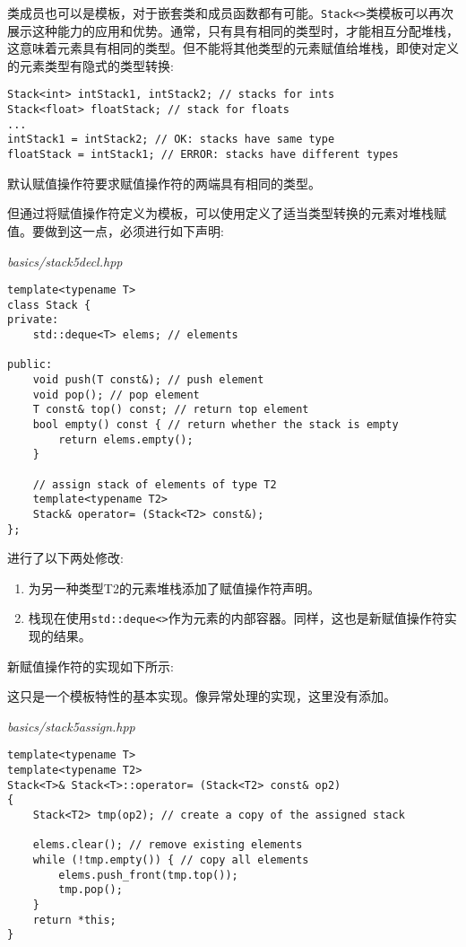 
类成员也可以是模板，对于嵌套类和成员函数都有可能。\texttt{Stack<>}类模板可以再次展示这种能力的应用和优势。通常，只有具有相同的类型时，才能相互分配堆栈，这意味着元素具有相同的类型。但不能将其他类型的元素赋值给堆栈，即使对定义的元素类型有隐式的类型转换:

\begin{lstlisting}[style=styleCXX]
Stack<int> intStack1, intStack2; // stacks for ints
Stack<float> floatStack; // stack for floats
...
intStack1 = intStack2; // OK: stacks have same type
floatStack = intStack1; // ERROR: stacks have different types
\end{lstlisting}

默认赋值操作符要求赋值操作符的两端具有相同的类型。

但通过将赋值操作符定义为模板，可以使用定义了适当类型转换的元素对堆栈赋值。要做到这一点，必须进行如下声明:

\noindent
\textit{basics/stack5decl.hpp}
\begin{lstlisting}[style=styleCXX]
template<typename T>
class Stack {
private:
	std::deque<T> elems; // elements
	
public:
	void push(T const&); // push element
	void pop(); // pop element
	T const& top() const; // return top element
	bool empty() const { // return whether the stack is empty
		return elems.empty();
	}
	
	// assign stack of elements of type T2
	template<typename T2>
	Stack& operator= (Stack<T2> const&);
};
\end{lstlisting}

进行了以下两处修改:

\begin{enumerate}
\item 
为另一种类型T2的元素堆栈添加了赋值操作符声明。

\item 
栈现在使用\texttt{std::deque<>}作为元素的内部容器。同样，这也是新赋值操作符实现的结果。
\end{enumerate}

新赋值操作符的实现如下所示:

\begin{tcolorbox}[colback=webgreen!5!white,colframe=webgreen!75!black]
\hspace*{0.75cm}这只是一个模板特性的基本实现。像异常处理的实现，这里没有添加。
\end{tcolorbox}

\noindent
\textit{basics/stack5assign.hpp}
\begin{lstlisting}[style=styleCXX]
template<typename T>
template<typename T2>
Stack<T>& Stack<T>::operator= (Stack<T2> const& op2)
{
	Stack<T2> tmp(op2); // create a copy of the assigned stack
	
	elems.clear(); // remove existing elements
	while (!tmp.empty()) { // copy all elements
		elems.push_front(tmp.top());
		tmp.pop();
	}
	return *this;
}
\end{lstlisting}

